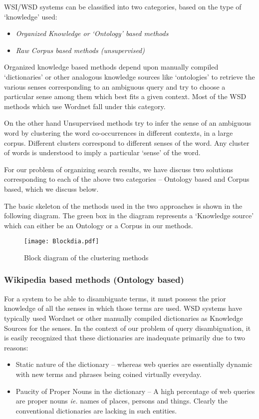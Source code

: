 \documentclass[a4paper,12pt]{report}
\begin{document}
WSI/WSD systems can be classified into two categories, based
on the type of `knowledge' used:
\begin{itemize}
  \item {\it Organized Knowledge or `Ontology' based methods}
  \item {\it Raw Corpus based methods (unsupervised)}
\end{itemize}

Organized knowledge based methods depend upon manually compiled
`dictionaries' or other analogous knowledge sources like `ontologies'
to retrieve the various senses corresponding to an ambiguous query and
try to choose a particular sense among them which best fits a given
context. Most of the WSD methods which use Wordnet fall under this
category.

On the other hand Unsupervised methods try to infer the sense of an
ambiguous word by clustering the word co-occurrences in different
contexts, in a large corpus. Different clusters correspond to
different senses of the word. Any cluster of words is understood to
imply a particular `sense' of the word.

For our problem of organizing search results, we have discuss two
solutions corresponding to each of the above two categories --
Ontology based and Corpus based, which we discuss below. 

The basic skeleton of the methods used in the two approaches is shown
in the following diagram. The green box in the diagram represents a
`Knowledge source' which can either be an Ontology or a Corpus in our
methods. 
\begin{figure}[h]
  \centering
  \texttt{[image: Blockdia.pdf]}
  \caption{Block diagram of the clustering methods}
\end{figure}
\subsubsection{Wikipedia based methods (Ontology based)}
For a system to be able to disambiguate terms, it must possess the
prior knowledge of all the senses in which those terms are used. WSD
systems have typically used Wordnet or other manually compiled
dictionaries as Knowledge Sources for the senses. In the context of
our problem of query disambiguation, it is easily recognized that
these dictionaries are inadequate primarily due to two reasons:
\begin{itemize}
  \item Static nature of the dictionary -- whereas web queries are
    essentially dynamic with new terms and phrases being coined
    virtually everyday.
  \item Paucity of Proper Nouns in the dictionary -- A high percentage
    of web queries are proper nouns {\it ie.} names of places, persons
    and things. Clearly the conventional dictionaries are lacking in
    such entities.
\end{itemize}
\end{document}

